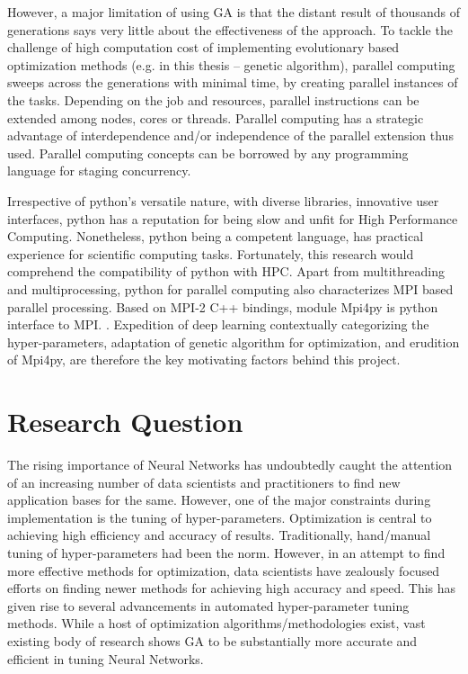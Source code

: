 However, a major limitation of using GA is that the distant result of thousands of generations says very little about the effectiveness of the approach. To tackle the challenge of high computation cost of implementing evolutionary based optimization methods (e.g. in this thesis – genetic algorithm), parallel computing sweeps across the generations with minimal time, by creating parallel instances of the tasks. Depending on the job and resources, parallel instructions can be extended among nodes, cores or threads. Parallel computing has a strategic advantage of interdependence and/or independence of the parallel extension thus used. Parallel computing concepts can be borrowed by any programming language for staging concurrency. 

Irrespective of python’s versatile nature, with diverse libraries, innovative user interfaces, python has a reputation for being slow and unfit for High Performance Computing. Nonetheless, python being a competent language, has practical experience for scientific computing tasks. Fortunately, this research would comprehend the compatibility of python with HPC. Apart from multithreading and multiprocessing, python for parallel computing also characterizes MPI based parallel processing. Based on MPI-2 C++ bindings, module Mpi4py is python interface to MPI. \cite{dalcin2011parallel}. 
Expedition of deep learning contextually categorizing the hyper-parameters, adaptation of genetic algorithm for optimization, and erudition of Mpi4py, are therefore the key motivating factors behind this project.

\section{Research Question}
The rising importance of Neural Networks has undoubtedly caught the attention of an increasing number of data scientists and practitioners to find new application bases for the same. However, one of the major constraints during implementation is the tuning of hyper-parameters. Optimization is central to achieving high efficiency and accuracy of results.
Traditionally, hand/manual tuning of hyper-parameters had been the norm. However, in an attempt to find more effective methods for optimization, data scientists have zealously focused efforts on finding newer methods for achieving high accuracy and speed. This has given rise to several advancements in automated hyper-parameter tuning methods. While a host of optimization algorithms/methodologies exist, vast existing body of research shows GA\cite{stanley2002evolving} to be substantially more accurate and efficient in tuning Neural Networks. 

